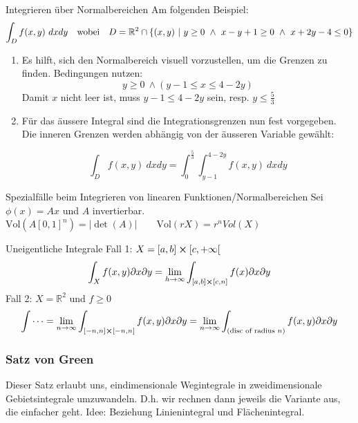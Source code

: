 \begin{Rezept}{Integrieren über Normalbereichen}{}
Am folgenden Beispiel:
\[ \int_D f(x, y) ~ dx dy ~~ \text{ wobei } ~~ D = \mathbb{R}^2 \cap \{(x, y) ~ | ~ y \geq 0 ~ \wedge ~ x-y+1\geq 0 ~ \wedge ~ x+2y-4 \leq 0\}\]
\begin{enumerate}
\item {
Es hilft, sich den Normalbereich visuell vorzustellen, um die Grenzen
zu finden. Bedingungen nutzen:
\[ y \geq 0 ~ \wedge (y-1 \leq x \leq 4-2y) \]
Damit $x$ nicht leer ist, muss $y-1 \leq 4-2y$ sein, resp. $y \leq \frac{5}{3}$ 
}
\item {
Für das äussere Integral sind die Integrationsgrenzen nun fest vorgegeben. Die inneren Grenzen
werden abhängig von der äusseren Variable gewählt:

\[ \int_D f(x,y) ~ dx dy = \int_0^{\frac{5}{3}} \int_{y-1}^{4-2y} f(x,y) ~ dx dy \]

}
\end{enumerate}
\end{Rezept}

\begin{Diverses}{Spezialfälle beim Integrieren von linearen Funktionen/Normalbereichen}{}
Sei $\phi(x) = Ax$ und $A$ invertierbar.\qquad
$
    \text{Vol}(A[0,1]^n) = |\det(A)| \qquad
    \text{Vol}(rX) = r^n Vol(X)
$
\end{Diverses}

\begin{Rezept}{Uneigentliche Integrale}{}
Fall 1: $X = [a,b] \cross [c, +\infty[$
\[
\int_X f(x,y) \partial x \partial y = \lim_{h \rightarrow \infty} \int_{[a,b] \cross [c, n]} f(x)\partial x \partial y
\]
Fall 2: $X=\mathbb{R}^2$ und $f \geq 0$
\[
\int \dots = \lim_{n \rightarrow \infty} \int_{[-n,n] \cross [-n,n]} f(x,y) \partial x \partial y =  \lim_{n \rightarrow \infty} \int_{\left(\text{disc of radius $n$}\right)} f(x,y) \partial x \partial y
\]
\end{Rezept}

\subsubsection{Satz von Green}

Dieser Satz erlaubt uns, eindimensionale Wegintegrale in zweidimensionale Gebietsintegrale umzuwandeln. D.h. wir rechnen dann jeweils die Variante aus, die einfacher geht.
Idee: Beziehung Linienintegral und Flächenintegral.


